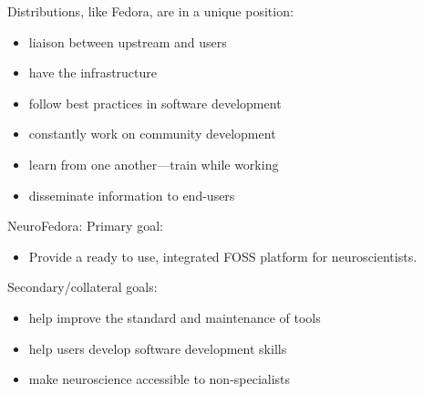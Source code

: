 \begin{frame}[c]{Distributions, like Fedora, are in a unique position:}
  \begin{itemize}
    \item \alert{liaison between upstream and users}
    \item have the \alert{infrastructure}
    \item \alert{follow best practices} in software development
    \item constantly \alert{work on community development}
    \item \alert{learn from one another}---train while working
    \item \alert{disseminate} information to end-users
  \end{itemize}
\end{frame}
\begin{frame}[c]{NeuroFedora:}
  \textcolor{FedoraBlue}{Primary goal:}
  \begin{itemize}
    \item Provide a \alert{ready to use, integrated FOSS platform} for neuroscientists\footnotemark[7].
  \end{itemize}
  \pause{}
  \textcolor{FirstGreen}{Secondary/collateral goals:}
  \pause{}
  \begin{itemize}
    \item help \alert{improve the standard and maintenance} of tools
    \item help users \alert{develop software development skills}
    \item \alert{make neuroscience accessible} to non-specialists
  \end{itemize}
\end{frame}
